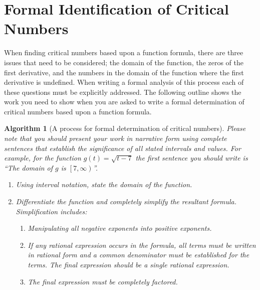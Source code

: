 \documentclass[10pt,oneside,]{book}
\theoremstyle{plain}
\newtheorem{algorithm}[theorem]{Algorithm}
\theoremstyle{definition}
\numberwithin{equation}{section}
\newcommand{\fe}[2]{#1\mathopen{}\left(#2\right)\mathclose{}}
\newcommand{\cointerval}[2]{\left[\left.#1,#2\right)\right.}
\begin{document}
\section[Formal ID of Critical Numbers]{Formal Identification of Critical Numbers}\label{section-formal-identification-of-critical-numbers}
When finding critical numbers based upon a function formula, there are three issues that need to be considered; the domain of the function, the zeros of the first derivative, and the numbers in the domain of the function where the first derivative is undefined.  When writing a formal analysis of this process each of these questions must be explicitly addressed.  The following outline shows the work you need to show when you are asked to write a formal determination of critical numbers based upon a function formula.%
\begin{algorithm}[A process for formal determination of critical numbers]\label{algorithm-find-critical-numbers}
Please note that you should present your work in narrative form using complete sentences that establish the significance of all stated intervals and values.  For example, for the function \(\fe{g}{t}=\sqrt{t-7}\) the first sentence you should write is ``The domain of \(g\) is \(\cointerval{7}{\infty}\)''.%
\begin{enumerate}
\item{}Using interval notation, state the domain of the function.\item{}Differentiate the function and completely simplify the resultant formula.  Simplification includes:
                    \begin{enumerate}
\item{}Manipulating all negative exponents into positive exponents.\item{}If any rational expression occurs in the formula, all terms must be written in rational form and a common denominator must be established for the terms.  The final expression should be a single rational expression.\item{}The final expression must be completely factored.\end{enumerate}


\end{enumerate}
\end{algorithm}
\end{document}
